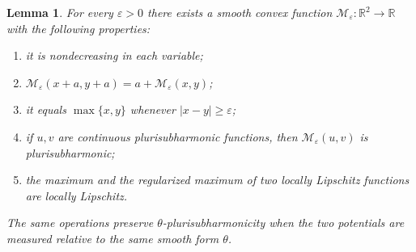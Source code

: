 \documentclass[11pt,a4paper]{article}
\numberwithin{equation}{section}
\newtheorem{lemma}[theorem]{Lemma}
\theoremstyle{definition}
\theoremstyle{remark}
\newcommand{\R}{\mathbb R}
\begin{document}
\begin{lemma}\label{pre:regularized-max}
For every $\varepsilon>0$ there exists a smooth convex function
$\mathcal M_\varepsilon:\R^2\to\R$ with the following properties:
\begin{enumerate}[label=\textup{(\roman*)}]
\item it is nondecreasing in each variable;
\item $\mathcal M_\varepsilon(x+a,y+a)=a+\mathcal M_\varepsilon(x,y)$;
\item it equals $\max\{x,y\}$ whenever $|x-y|\ge\varepsilon$;
\item if $u,v$ are continuous plurisubharmonic functions, then
$\mathcal M_\varepsilon(u,v)$ is plurisubharmonic;
\item the maximum and the regularized maximum of two locally Lipschitz
functions are locally Lipschitz.
\end{enumerate}
The same operations preserve $\theta$-plurisubharmonicity when the two
potentials are measured relative to the same smooth form $\theta$.
\end{lemma}
\end{document}
